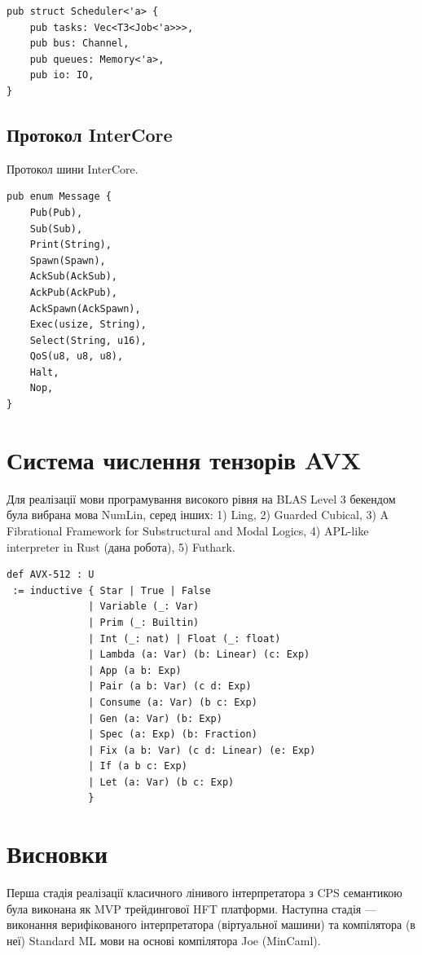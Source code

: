 \begin{lstlisting}
pub struct Scheduler<'a> {
    pub tasks: Vec<T3<Job<'a>>>,
    pub bus: Channel,
    pub queues: Memory<'a>,
    pub io: IO,
}
\end{lstlisting}

\newpage
\subsection{Протокол InterCore}
Протокол шини InterCore.

\begin{lstlisting}
pub enum Message {
    Pub(Pub),
    Sub(Sub),
    Print(String),
    Spawn(Spawn),
    AckSub(AckSub),
    AckPub(AckPub),
    AckSpawn(AckSpawn),
    Exec(usize, String),
    Select(String, u16),
    QoS(u8, u8, u8),
    Halt,
    Nop,
}
\end{lstlisting}

\section{Система числення тензорів AVX}
Для реалізації мови програмування високого рівня на BLAS Level 3 бекендом
була вибрана мова NumLin, серед інших: 1) Ling, 2) Guarded Cubical,
3) A Fibrational Framework for Substructural and Modal Logics,
4) APL-like interpreter in Rust (дана робота), 5) Futhark.

\begin{lstlisting}
def AVX-512 : U
 := inductive { Star | True | False
              | Variable (_: Var)
              | Prim (_: Builtin)
              | Int (_: nat) | Float (_: float)
              | Lambda (a: Var) (b: Linear) (c: Exp)
              | App (a b: Exp)
              | Pair (a b: Var) (c d: Exp)
              | Consume (a: Var) (b c: Exp)
              | Gen (a: Var) (b: Exp)
              | Spec (a: Exp) (b: Fraction)
              | Fix (a b: Var) (c d: Linear) (e: Exp)
              | If (a b c: Exp)
              | Let (a: Var) (b c: Exp)
              }
\end{lstlisting}

\section{Висновки}
Перша стадія реалізації класичного лінивого інтерпретатора з CPS семантикою
була виконана як MVP трейдингової HFT платформи. Наступна стадія — виконання
верифікованого інтерпретатора (віртуальної машини) та компілятора (в неї) Standard ML мови на
основі компілятора Joe (MinCaml).
